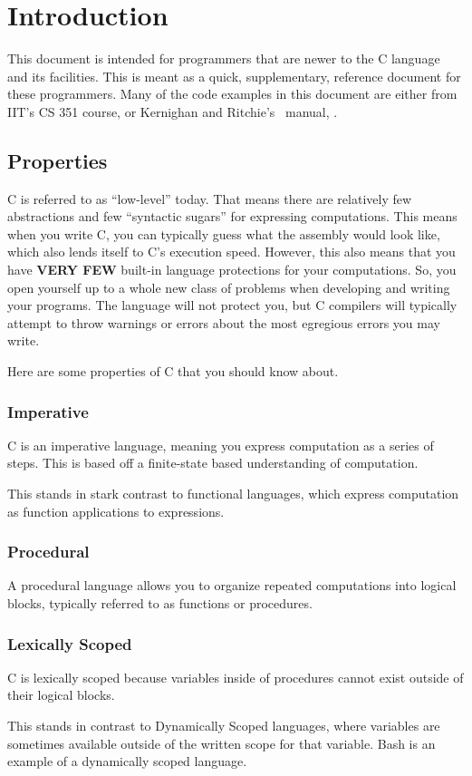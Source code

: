 \section{Introduction}\label{sec:Intro}
This document is intended for programmers that are newer to the C language and its facilities.
This is meant as a quick, supplementary, reference document for these programmers.
Many of the code examples in this document are either from IIT's CS 351 course, or Kernighan and Ritchie's~\cite{KernighanRitchieCProg} manual, .

\subsection{Properties}\label{subsec:Properties}
C is referred to as ``low-level'' today.
That means there are relatively few abstractions and few ``syntactic sugars'' for expressing computations.
This means when you write C, you can typically guess what the assembly would look like, which also lends itself to C's execution speed.
However, this also means that you have \textbf{VERY FEW} built-in language protections for your computations.
So, you open yourself up to a whole new class of problems when developing and writing your programs.
The language will not protect you, but C compilers will typically attempt to throw warnings or errors about the most egregious errors you may write.

Here are some properties of C that you should know about.

\subsubsection{Imperative}\label{subsubsec:Imperative}
C is an imperative language, meaning you express computation as a series of steps.
This is based off a finite-state based understanding of computation.

This stands in stark contrast to functional languages, which express computation as function applications to expressions.

\subsubsection{Procedural}\label{subsubsec:Procedural}
A procedural language allows you to organize repeated computations into logical blocks, typically referred to as functions or procedures.

\subsubsection{Lexically Scoped}\label{subsubsec:Lexically_Scoped}
C is lexically scoped because variables inside of procedures cannot exist outside of their logical blocks.

This stands in contrast to Dynamically Scoped languages, where variables are sometimes available outside of the written scope for that variable.
Bash is an example of a dynamically scoped language.



